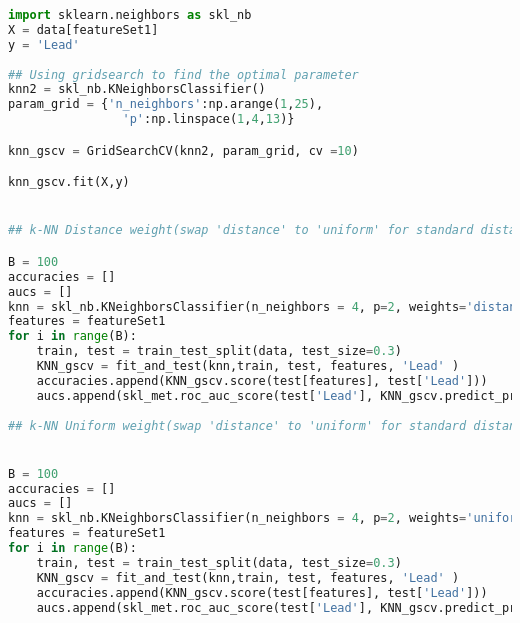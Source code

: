 \documentclass[../../project.tex]{subfiles}
\begin{document}
	\begin{lstlisting}[language=Python]
import sklearn.neighbors as skl_nb
X = data[featureSet1]	
y = 'Lead'
	
## Using gridsearch to find the optimal parameter
knn2 = skl_nb.KNeighborsClassifier()
param_grid = {'n_neighbors':np.arange(1,25),
                'p':np.linspace(1,4,13)}

knn_gscv = GridSearchCV(knn2, param_grid, cv =10)

knn_gscv.fit(X,y)


## k-NN Distance weight(swap 'distance' to 'uniform' for standard distance) after transformations(swap featureSet1 to rawFeatures for before transformations)

B = 100
accuracies = []
aucs = []
knn = skl_nb.KNeighborsClassifier(n_neighbors = 4, p=2, weights='distance')
features = featureSet1
for i in range(B):
    train, test = train_test_split(data, test_size=0.3)
    KNN_gscv = fit_and_test(knn,train, test, features, 'Lead' )
    accuracies.append(KNN_gscv.score(test[features], test['Lead']))
    aucs.append(skl_met.roc_auc_score(test['Lead'], KNN_gscv.predict_proba(test[features])[:,1]))
    
## k-NN Uniform weight(swap 'distance' to 'uniform' for standard distance) after transformations(swap featureSet1 to rawFeatures for before transformations)


B = 100
accuracies = []
aucs = []
knn = skl_nb.KNeighborsClassifier(n_neighbors = 4, p=2, weights='uniform')
features = featureSet1
for i in range(B):
    train, test = train_test_split(data, test_size=0.3)
    KNN_gscv = fit_and_test(knn,train, test, features, 'Lead' )
    accuracies.append(KNN_gscv.score(test[features], test['Lead']))
    aucs.append(skl_met.roc_auc_score(test['Lead'], KNN_gscv.predict_proba(test[features])[:,1]))

	
	
		\end{lstlisting}
\end{document}
